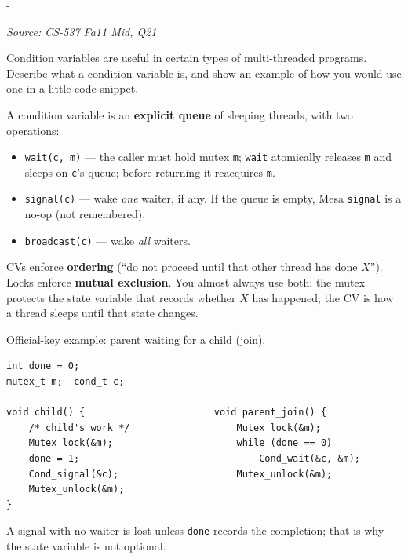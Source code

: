 \documentclass[11pt,a4paper]{article}
\makeatletter
\newcommand{\keepspace}[1]{\par\penalty-100\begingroup
  \setlength{\dimen@}{#1}\dimen@ii\pagegoal\advance\dimen@ii-\pagetotal
  \ifdim\dimen@>\dimen@ii\ifdim\dimen@ii>\z@\vfil\fi\break\fi\endgroup}
\newcounter{qn}[section]
\newenvironment{Qn}[4]{%
  \refstepcounter{qn}\keepspace{7\baselineskip}%
  \begin{tcolorbox}[qboxstyle, title={Q\thesection.\theqn\ \ [#1 \textbar\ #2]\ \ #4}]%
  {\footnotesize\color{g3}\textit{Source: #3}}\par\smallskip%
}{%
  \end{tcolorbox}%
}
\newenvironment{Sol}{%
  \begin{tcolorbox}[sboxstyle, title={Solution}]%
}{%
  \end{tcolorbox}\vspace{0.35em}%
}
\makeatother
\begin{document}
\begin{Qn}{Easy-Medium}{Lect 18}{CS-537 Fa11 Mid, Q21}{Define a CV and show a join snippet}
Condition variables are useful in certain types of multi-threaded
programs. Describe what a condition variable is, and show an example of
how you would use one in a little code snippet.
\end{Qn}
\begin{Sol}
A condition variable is an \textbf{explicit queue} of sleeping threads,
with two operations:
\begin{itemize}
\item \texttt{wait(c, m)} --- the caller must hold mutex \texttt{m};
      \texttt{wait} atomically releases \texttt{m} and sleeps on
      \texttt{c}'s queue; before returning it reacquires \texttt{m}.
\item \texttt{signal(c)} --- wake \emph{one} waiter, if any. If the
      queue is empty, Mesa \texttt{signal} is a no-op (not remembered).
\item \texttt{broadcast(c)} --- wake \emph{all} waiters.
\end{itemize}
CVs enforce \textbf{ordering} (``do not proceed until that other thread
has done $X$''). Locks enforce \textbf{mutual exclusion}. You almost
always use both: the mutex protects the state variable that records
whether $X$ has happened; the CV is how a thread sleeps until that
state changes.

Official-key example: parent waiting for a child (join).
\begin{lstlisting}[numbers=none]
int done = 0;
mutex_t m;  cond_t c;

void child() {                       void parent_join() {
    /* child's work */                   Mutex_lock(&m);
    Mutex_lock(&m);                      while (done == 0)
    done = 1;                                Cond_wait(&c, &m);
    Cond_signal(&c);                     Mutex_unlock(&m);
    Mutex_unlock(&m);
}
\end{lstlisting}
A signal with no waiter is lost unless \texttt{done} records the
completion; that is why the state variable is not optional.
\end{Sol}
\end{document}
